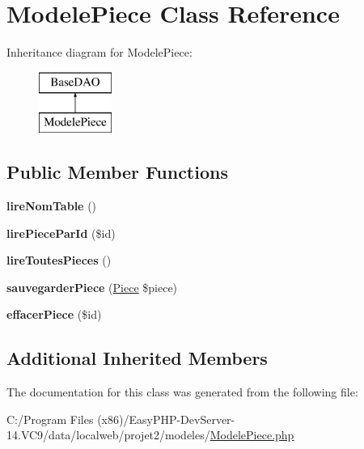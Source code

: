 \hypertarget{class_modele_piece}{}\section{Modele\+Piece Class Reference}
\label{class_modele_piece}
Inheritance diagram for Modele\+Piece\+:\begin{figure}[H]
\begin{center}
\leavevmode
\includegraphics[height=2.000000cm]{class_modele_piece}
\end{center}
\end{figure}
\subsection*{Public Member Functions}
\begin{DoxyCompactItemize}
\item 
\mbox{\label{class_modele_piece_ae224f8c9653e54371d67eab354b224c4}} 
{\bfseries lire\+Nom\+Table} ()
\item 
\mbox{\label{class_modele_piece_ad67f2dbe111ee5c063d1a20f57c6f456}} 
{\bfseries lire\+Piece\+Par\+Id} (\$id)
\item 
\mbox{\label{class_modele_piece_a5214d004d4810033cf6a17fc644b166b}} 
{\bfseries lire\+Toutes\+Pieces} ()
\item 
\mbox{\label{class_modele_piece_a5309842623090acec44bbddc6fd155d8}} 
{\bfseries sauvegarder\+Piece} (\hyperlink{class_piece}{Piece} \$piece)
\item 
\mbox{\label{class_modele_piece_ad52ef3b83c9ea381398b4b73b99f1d95}} 
{\bfseries effacer\+Piece} (\$id)
\end{DoxyCompactItemize}
\subsection*{Additional Inherited Members}


The documentation for this class was generated from the following file\+:\begin{DoxyCompactItemize}
\item 
C\+:/\+Program Files (x86)/\+Easy\+P\+H\+P-\/\+Dev\+Server-\/14.\+V\+C9/data/localweb/projet2/modeles/\hyperlink{_modele_piece_8php}{Modele\+Piece.\+php}\end{DoxyCompactItemize}
